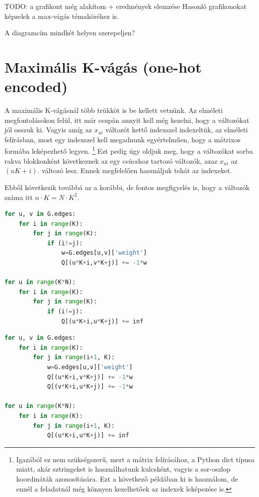 TODO: a grafikont még alakítom + eredmények elemzése
Hasonló grafikonokat képzelek a max-vágás témaköréhez is.

A diagramcím mindkét helyen szerepeljen?

\section{Maximális K-vágás (one-hot encoded)}

A maximális K-vágásnál több trükköt is be kellett vetnünk. Az elméleti megfontolásokon felül, itt már csupán annyit kell még kezelni, hogy a változókat jól osszuk ki. Vagyis amíg az $x_{ui}$ változót kettő indexszel indexeltük, az elméleti felírásban, most egy indexszel kell megadnunk egyértelműen, hogy a mátrixos formába leképezhető legyen.
\footnote{Igazából ez nem szükségszerű, mert a mátrix felírásához, a Python dict típusa miatt, akár sztringeket is használhatunk kulcsként, vagyis a sor-oszlop koordináták azonosítására. Ezt a következő példában ki is használom, de ennél a feladatnál még könnyen kezelhetőek az indexek leképezése is.}
Ezt pedig úgy oldjuk meg, hogy a változókat sorba rakva blokkonként következnek az egy csúcshoz tartozó változók, azaz $x_{ui}$ az $(uK+i)$. változó lesz. Ennek megfelelően használjuk tehát az indexeket.

Ebből következik továbbá az a korábbi, de fontos megfigyelés is, hogy a változók száma itt $n \cdot K = N \cdot K^2$.

\begin{lstlisting}[language=python,caption=Max-K-cut QUBO (szimmetrikus mátrix), label=code:maxKCutQUBOSymmetric]
for u, v in G.edges:
	for i in range(K):
		for j in range(K):
			if (i!=j):
				w=G.edges[u,v]['weight']
				Q[(u*K+i,v*K+j)] += -1*w

for u in range(K*N):
	for i in range(K):
		for j in range(K):
			if (i!=j):
				Q[(u*K+i,u*K+j)] += inf 
\end{lstlisting}

\begin{lstlisting}[language=python,caption=Max-K-cut QUBO (háromszög mátrix),label=code:maxKCutQUBOTriangle]
for u, v in G.edges:
	for i in range(K):
		for j in range(i+1, K):
			w=G.edges[u,v]['weight']
			Q[(u*K+i,v*K+j)] += -1*w
			Q[(v*K+i,u*K+j)] += -1*w

for u in range(K*N):
	for i in range(K):
		for j in range(i+1, K):
			Q[(u*K+i,u*K+j)] += inf
\end{lstlisting}

